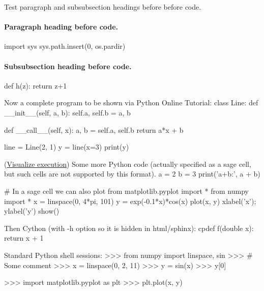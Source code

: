 \documentclass[%
oneside,                 %
final,                   %
10pt]{article}
\theoremstyle{definition}
\begin{document}
\epycod

Test paragraph and subsubsection headings before
before code.
\paragraph{Paragraph heading before code.}
\bpycod
import sys
sys.path.insert(0, os.pardir)

\epycod

\paragraph{Subsubsection heading before code.}
\bpycod
def h(z):
    return z+1

\epycod

Now a complete program to be shown via Python Online Tutorial:
\bpypro
class Line:
    def __init__(self, a, b):
        self.a, self.b = a, b

    def __call__(self, x):
        a, b = self.a, self.b
        return a*x + b

line = Line(2, 1)
y = line(x=3)
print(y)

\epypro

\noindent
(\href{{https://pythontutor.com/visualize.html\#code=class+Line\%3A\%0A++++def+__init__\%28self\%2C+a\%2C+b\%29\%3A\%0A++++++++self.a\%2C+self.b+\%3D+a\%2C+b\%0A\%0A++++def+__call__\%28self\%2C+x\%29\%3A\%0A++++++++a\%2C+b+\%3D+self.a\%2C+self.b\%0A++++++++return+a\%2Ax+\%2B+b\%0A\%0Aline+\%3D+Line\%282\%2C+1\%29\%0Ay+\%3D+line\%28x\%3D3\%29\%0Aprint\%28y\%29&mode=display&cumulative=false&heapPrimitives=false&drawParentPointers=false&textReferences=false&py=2&curInstr=0}}{Visualize execution}) 
Some more Python code (actually specified as a sage cell, but
such cells are not supported by this format).
\bpypro
a = 2
b = 3
print('a+b:', a + b)

# In a sage cell we can also plot
from matplotlib.pyplot import *
from numpy import *
x = linspace(0, 4*pi, 101)
y = exp(-0.1*x)*cos(x)
plot(x, y)
xlabel('x'); ylabel('y')
show()

\epypro

Then Cython (with -h option so it is hidden in html/sphinx):
\bcycod
cpdef f(double x):
    return x + 1

\ecycod

Standard Python shell sessions:
\bpyshell
>>> from numpy import linspace, sin
>>> # Some comment
>>> x = linspace(0, 2, 11)
>>> y = sin(x)
>>> y[0]

>>> import matplotlib.pyplot as plt
>>> plt.plot(x, y)
\end{document}
